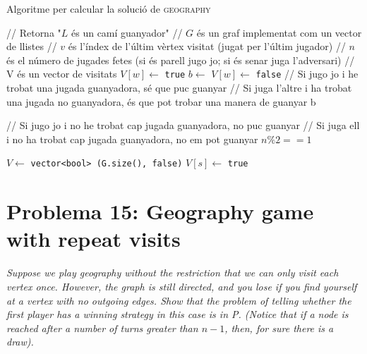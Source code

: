 \documentclass[a4paper]{article}
\begin{document}
\begin{algorithm}[H]
	\caption{Algoritme per calcular la solució de \textsc{geography}}
	\begin{algorithmic}[1]
		\State // Retorna "$L$ és un camí guanyador"
		\State // $G$ és un graf implementat com un vector de llistes
		\State // $v$ és l'índex de l'últim vèrtex visitat (jugat per l'últim jugador)
		\State // $n$ és el número de jugades fetes (si és parell jugo jo; si és senar juga l'adversari)
		\State // V és un vector de visitats
					\State $V[w] \gets$ \texttt{true}
					\State $b \gets$ 
					\State $V[w] \gets$ \texttt{false}
					\State
					\State // Si jugo jo i he trobat una jugada guanyadora, sé que puc guanyar
					\State // Si juga l'altre i ha trobat una jugada no guanyadora, és que pot trobar una manera de guanyar
						\State \Return b
					\EndIf
				\EndIf
			\EndFor
			
			\State // Si jugo jo i no he trobat cap jugada guanyadora, no puc guanyar
			\State // Si juga ell i no ha trobat cap jugada guanyadora, no em pot guanyar
			\State \Return $n\%2 == 1$
		\EndFunction
	\end{algorithmic}
\end{algorithm}

\begin{algorithm}[!h]
	\begin{algorithmic}[1]
			\State $V \gets$  \texttt{vector<bool> (G.size(), false)}
			\State $V[s] \gets$ \texttt{true}
			\State \Return {}
		\EndFunction
	\end{algorithmic}
\end{algorithm}

\section{Problema 15: Geography game with repeat visits}
\emph{Suppose we play geography without the restriction that we can only visit each vertex once. However, the graph is still directed, and you lose if you find yourself at a vertex with no outgoing edges. Show that the problem of telling whether the first player has a winning strategy in this case is in P. (Notice that if a node is reached after a number of turns greater than $n − 1$, then, for sure there is a draw).}
\end{document}
